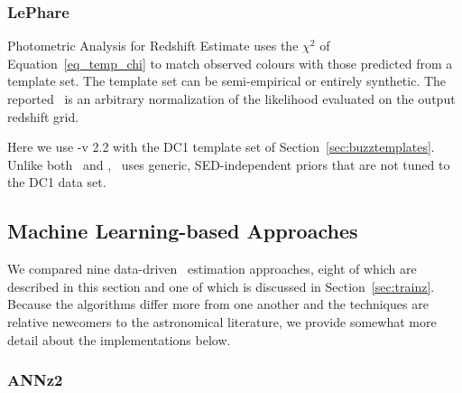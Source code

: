 \subsubsection{LePhare}
\label{sec:lephare}

Photometric Analysis for Redshift Estimate \citep[\lephare,][]{Arnouts:99,Ilbert:06} uses the $\chi^2$ of Equation~\ref{eq_temp_chi} to match observed colours with those predicted from a template set.
The template set can be semi-empirical or entirely synthetic.
The reported \pzpdf\ is an arbitrary normalization of the likelihood evaluated on the output redshift grid.

Here we use \lephare-v 2.2 with the DC1 template set of Section~\ref{sec:buzztemplates}.
Unlike both \bpz\ and \eazy, \lephare\ uses generic, SED-independent priors that are not tuned to the DC1 data set.  

\subsection{Machine Learning-based Approaches}
\label{sec:trainingcodes}

We compared nine data-driven \pz\ estimation approaches, eight of which are described in this section and one of which is discussed in Section~\ref{sec:trainz}.
Because the algorithms differ more from one another and the techniques are relative newcomers to the astronomical literature, we provide somewhat more detail about the implementations below.


\subsubsection{ANNz2}
\label{sec:annz2}

